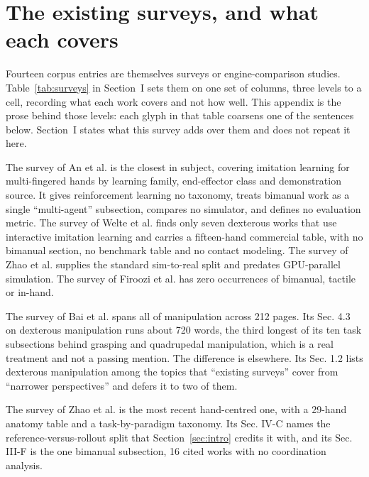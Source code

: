 \section{The existing surveys, and what each covers}
\label{app:surveys}

Fourteen corpus entries are themselves surveys or engine-comparison studies.
Table~\ref{tab:surveys} in Section~I sets them on one set of columns, three levels to a cell,
recording what each work covers and not how well. This appendix is the prose behind those levels:
each glyph in that table coarsens one of the sentences below. Section~I states what this survey
adds over them and does not repeat it here.

The survey of An et al. \cite{an_dexil_survey_2025} is the closest in subject, covering imitation
learning for multi-fingered
hands by learning family, end-effector class and demonstration source. It gives reinforcement
learning no taxonomy, treats bimanual work as a single ``multi-agent'' subsection, compares no
simulator, and defines no evaluation metric. The survey of Welte et al. \cite{welte_iil_survey_2025}
finds only seven dexterous
works that use interactive imitation learning and carries a fifteen-hand commercial table, with no
bimanual section, no benchmark table and no contact modeling. The survey of Zhao et al.
\cite{zhao_sim2real_survey_2020}
supplies the standard sim-to-real split and predates GPU-parallel simulation.
The survey of Firoozi et al. \cite{firoozi_foundation_models_2023} has zero occurrences of bimanual,
tactile or in-hand.

The survey of Bai et al. \cite{bai_unified_manip_survey_2025} spans all of manipulation across 212
pages. Its Sec. 4.3 on
dexterous manipulation runs about 720 words, the third longest of its ten task subsections behind
grasping and quadrupedal manipulation, which is a real treatment and not a passing mention. The
difference is elsewhere. Its Sec. 1.2 lists dexterous manipulation among the topics that ``existing
surveys'' cover from ``narrower perspectives'' and defers it to two of them.

The survey of Zhao et al. \cite{zhao_dexhand_survey_2026} is the most recent hand-centred one, with
a 29-hand anatomy table
and a task-by-paradigm taxonomy. Its Sec. IV-C names the reference-versus-rollout split that
Section~\ref{sec:intro} credits it with, and its Sec. III-F is the one bimanual subsection, 16 cited works with
no coordination analysis.

